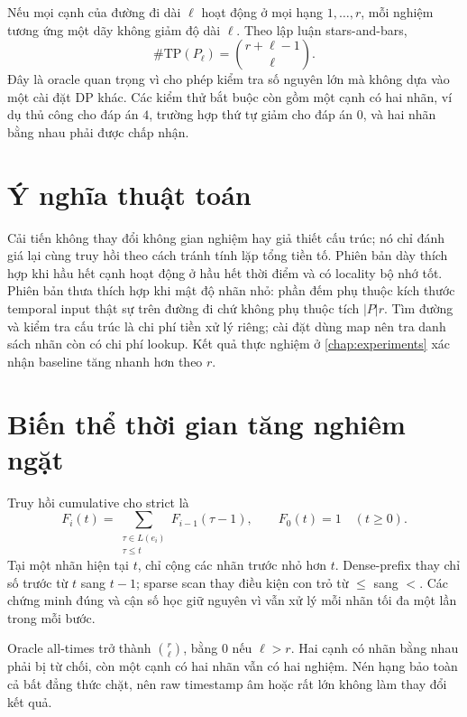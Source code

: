 Nếu mọi cạnh của đường đi dài $\ell$ hoạt động ở mọi hạng $1,\ldots,r$, mỗi nghiệm tương ứng một dãy không giảm độ dài $\ell$. Theo lập luận stars-and-bars,
\begin{equation}
\label{eq:path-closed-form}
  \#\mathrm{TP}(P_\ell)=\binom{r+\ell-1}{\ell}.
\end{equation}
Đây là oracle quan trọng vì cho phép kiểm tra số nguyên lớn mà không dựa vào một cài đặt DP khác. Các kiểm thử bắt buộc còn gồm một cạnh có hai nhãn, ví dụ thủ công cho đáp án $4$, trường hợp thứ tự giảm cho đáp án $0$, và hai nhãn bằng nhau phải được chấp nhận.

\section{Ý nghĩa thuật toán}

Cải tiến không thay đổi không gian nghiệm hay giả thiết cấu trúc; nó chỉ đánh giá lại cùng truy hồi theo cách tránh tính lặp tổng tiền tố. Phiên bản dày thích hợp khi hầu hết cạnh hoạt động ở hầu hết thời điểm và có locality bộ nhớ tốt. Phiên bản thưa thích hợp khi mật độ nhãn nhỏ: phần đếm phụ thuộc kích thước temporal input thật sự trên đường đi chứ không phụ thuộc tích $|P|r$. Tìm đường và kiểm tra cấu trúc là chi phí tiền xử lý riêng; cài đặt dùng map nên tra danh sách nhãn còn có chi phí lookup. Kết quả thực nghiệm ở \cref{chap:experiments} xác nhận baseline tăng nhanh hơn theo $r$.

\section{Biến thể thời gian tăng nghiêm ngặt}

Truy hồi cumulative cho strict là
\[
 F_i(t)=\sum_{\substack{\tau\in L(e_i)\\\tau\le t}}F_{i-1}(\tau-1),
 \qquad F_0(t)=1\quad(t\ge0).
\]
Tại một nhãn hiện tại $t$, chỉ cộng các nhãn trước nhỏ hơn $t$. Dense-prefix thay chỉ số trước từ $t$ sang $t-1$; sparse scan thay điều kiện con trỏ từ $\le$ sang $<$. Các chứng minh đúng và cận số học giữ nguyên vì vẫn xử lý mỗi nhãn tối đa một lần trong mỗi bước.

Oracle all-times trở thành $\binom{r}{\ell}$, bằng $0$ nếu $\ell>r$. Hai cạnh có nhãn bằng nhau phải bị từ chối, còn một cạnh có hai nhãn vẫn có hai nghiệm. Nén hạng bảo toàn cả bất đẳng thức chặt, nên raw timestamp âm hoặc rất lớn không làm thay đổi kết quả.
